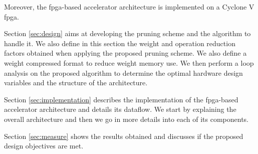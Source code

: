 Moreover, the \acrshort{fpga}-based accelerator architecture is implemented on a Cyclone V \acrshort{fpga}.

Section \ref{sec:design} aims at developing the pruning scheme and the algorithm to handle it. We also define in this section the weight and operation reduction factors obtained when applying the proposed pruning scheme. We also define a weight compressed format to reduce weight memory use. We then perform a loop analysis on the proposed algorithm to determine the optimal hardware design variables and the structure of the architecture.

Section \ref{sec:implementation} describes the implementation of the \acrshort{fpga}-based accelerator architecture and details its dataflow. We start by explaining the overall architecture and then we go in more details into each of its components.

Section \ref{sec:measure} shows the results obtained and discusses if the proposed design objectives are met.
%

%
%

%
%

%
%
\newpage
